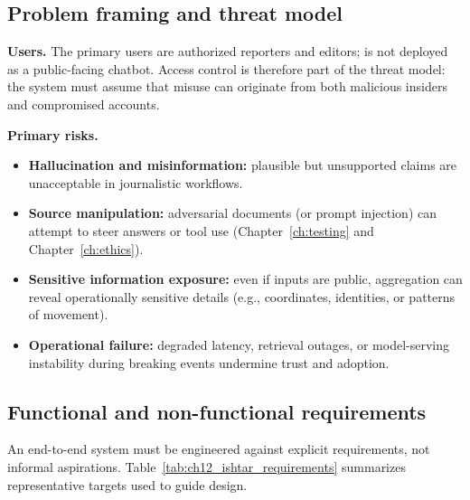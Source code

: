 \subsection{Problem framing and threat model}
\label{sec:ishtar-problem-framing}

\textbf{Users.} The primary users are authorized reporters and editors; \ishtar{} is not deployed as a public-facing chatbot.
Access control is therefore part of the threat model: the system must assume that misuse can originate from both malicious insiders and compromised accounts.

\textbf{Primary risks.}
\begin{itemize}
    \item \textbf{Hallucination and misinformation:} plausible but unsupported claims are unacceptable in journalistic workflows.
    \item \textbf{Source manipulation:} adversarial documents (or prompt injection) can attempt to steer answers or tool use (Chapter~\ref{ch:testing} and Chapter~\ref{ch:ethics}).
    \item \textbf{Sensitive information exposure:} even if inputs are public, aggregation can reveal operationally sensitive details (e.g., coordinates, identities, or patterns of movement).
    \item \textbf{Operational failure:} degraded latency, retrieval outages, or model-serving instability during breaking events undermine trust and adoption.
\end{itemize}

\subsection{Functional and non-functional requirements}
\label{sec:ishtar-requirements}

An end-to-end system must be engineered against explicit requirements, not informal aspirations.
Table~\ref{tab:ch12_ishtar_requirements} summarizes representative targets used to guide \ishtar{} design.

